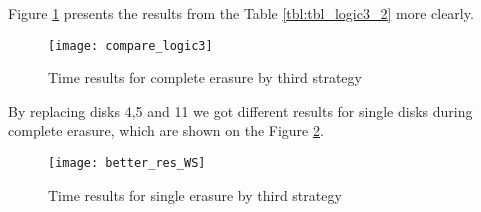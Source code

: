 \newpage
Figure \ref{fig:compare_logic3} presents the results from the Table \ref{tbl:tbl_logic3_2} more clearly.
\begin{figure}[h!]
\begin{center}
  \texttt{[image: compare\_logic3]}
\end{center}
  \caption{Time results for complete erasure by third strategy}
  \label{fig:compare_logic3}
\end{figure}

By replacing disks 4,5 and 11 we got different results for single disks during complete erasure, which are shown on the Figure \ref{fig:better_res_WS}.
\begin{figure}[h!]
\begin{center}
  \texttt{[image: better\_res\_WS]}
\end{center}
  \caption{Time results for single erasure by third strategy}
  \label{fig:better_res_WS}
\end{figure}




\newpage

